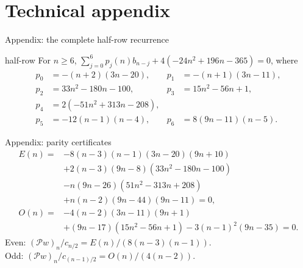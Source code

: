 \documentclass{beamer}
\begin{document}
\section{Technical appendix}
\begin{frame}{Appendix: the complete half-row recurrence}
\small
\begin{bookresult}{half-row}
For $n\ge6$, $\sum_{j=0}^6p_j(n)b_{n-j}+4(-24n^2+196n-365)=0$, where
\[
\begin{aligned}
p_0&=-(n+2)(3n-20),&p_1&=-(n+1)(3n-11),\\
p_2&=33n^2-180n-100,&p_3&=15n^2-56n+1,\\
p_4&=2(-51n^2+313n-208),\\
p_5&=-12(n-1)(n-4),&p_6&=8(9n-11)(n-5).
\end{aligned}
\]
\end{bookresult}
\end{frame}
\begin{frame}{Appendix: parity certificates}
\footnotesize
\[
\begin{aligned}
E(n)={}&-8(n-3)(n-1)(3n-20)(9n+10)\\
&+2(n-3)(9n-8)(33n^2-180n-100)\\
&-n(9n-26)(51n^2-313n+208)\\
&+n(n-2)(9n-44)(9n-11)=0,\\
O(n)={}&-4(n-2)(3n-11)(9n+1)\\
&+(9n-17)(15n^2-56n+1)-3(n-1)^2(9n-35)=0.
\end{aligned}
\]
Even: $(\mathcal Pw)_n/c_{n/2}=E(n)/(8(n-3)(n-1))$.\\
Odd: $(\mathcal Pw)_n/c_{(n-1)/2}=O(n)/(4(n-2))$.
\end{frame}
\end{document}
